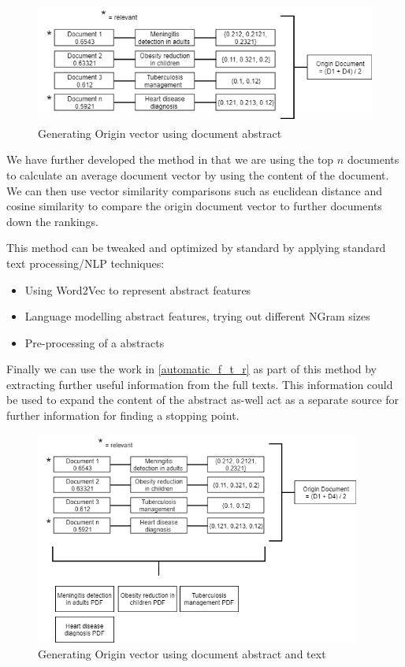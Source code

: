 \begin{figure}[H]
\center
\includegraphics[height=4cm]{figures/origin2.png}
\caption{Generating Origin vector using document abstract}
\end{figure}


We have further developed the method in that we are using the top $n$ documents to calculate an average document vector by using the content of the document. We can then use vector similarity comparisons such as euclidean distance and cosine similarity to compare the origin document vector to further documents down the rankings.

This method can be tweaked and optimized by standard by applying standard text processing/NLP techniques:

\begin{itemize}
  \item Using Word2Vec to represent abstract features
  \item Language modelling abstract features, trying out different NGram sizes
  \item Pre-processing of a abstracts
  
\end{itemize}

Finally we can use the work in \ref{automatic_f_t_r} as part of this method by extracting further useful information from the full texts. This information could be used to expand the content of the abstract as-well act as a separate source for further information for finding a stopping point.


\begin{figure}[H]
\center
\includegraphics[height=7cm]{figures/origin3.png}
\caption{Generating Origin vector using document abstract and text}
\end{figure}


